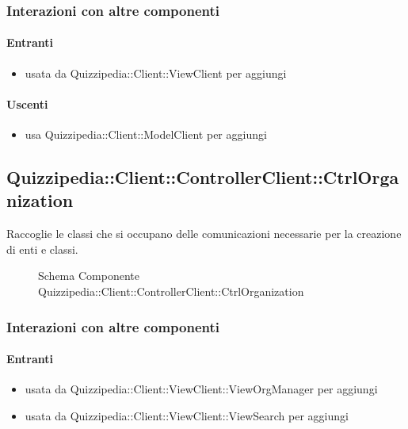 \subsubsection{Interazioni con altre componenti}
\paragraph{Entranti}
\begin{itemize}
\item usata da Quizzipedia::Client::ViewClient per aggiungi
\end{itemize}
\paragraph{Uscenti}
\begin{itemize}
\item usa Quizzipedia::Client::ModelClient per aggiungi
\end{itemize}
\subsection{Quizzipedia::Client::ControllerClient::CtrlOrganization}
Raccoglie le classi che si occupano delle comunicazioni necessarie per la creazione di enti e classi.
\begin{figure}[H]
\centering
\noindent{}
\caption[Schema Componente Quizzipedia::Client::ControllerClient::CtrlOrganization]{Schema Componente Quizzipedia::Client::ControllerClient::CtrlOrganization}
\end{figure}
\subsubsection{Interazioni con altre componenti}
\paragraph{Entranti}
\begin{itemize}
\item usata da Quizzipedia::Client::ViewClient::ViewOrgManager per aggiungi
\item usata da Quizzipedia::Client::ViewClient::ViewSearch per aggiungi
\end{itemize}
